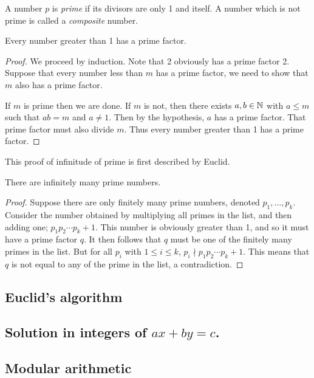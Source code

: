 \documentclass[main.tex]{subfiles}
\begin{document}
			\begin{definition}
				A number $p$ is \textit{prime} if its divisors are only 1 and itself. A number which is not prime is called a \textit{composite} number.
			\end{definition}
			\begin{theorem}
				Every number greater than 1 has a prime factor.
			\end{theorem}
			\begin{proof}
				We proceed by induction. Note that 2 obviously has a prime factor 2. Suppose that every number less than $m$ has a prime factor, we need to show that $m$ also has a prime factor. 
				
				If $m$ is prime then we are done. If $m$ is not, then there exists $a, b \in\mathbb N$ with $a \leq m$ such that $ab = m$ and $a \neq 1$. Then by the hypothesis, $a$ has a prime factor. That prime factor must also divide $m$. Thus every number greater than 1 has a prime factor.
			\end{proof}
			This proof of infinitude of prime is first described by Euclid.
			\begin{theorem}
				There are infinitely many prime numbers.
			\end{theorem}
			\begin{proof}
				Suppose there are only finitely many prime numbers, denoted $p_1,\ldots, p_k$. Consider the number obtained by multiplying all primes in the list, and then adding one; $p_1p_2\cdots p_k + 1$. This number is obviously greater than 1, and so it must have a prime factor $q$. It then follows that $q$ must be one of the finitely many primes in the list. But for all $p_i$ with $1 \leq i \leq k$, $p_i \nmid p_1p_2\cdots p_k + 1$. This means that $q$ is not equal to any of the prime in the list, a contradiction. 
			\end{proof}
		\subsection{Euclid's algorithm}
		
		\subsection{Solution in integers of $ax + by = c$.}
		
		\subsection{Modular arithmetic}
		
\end{document}
